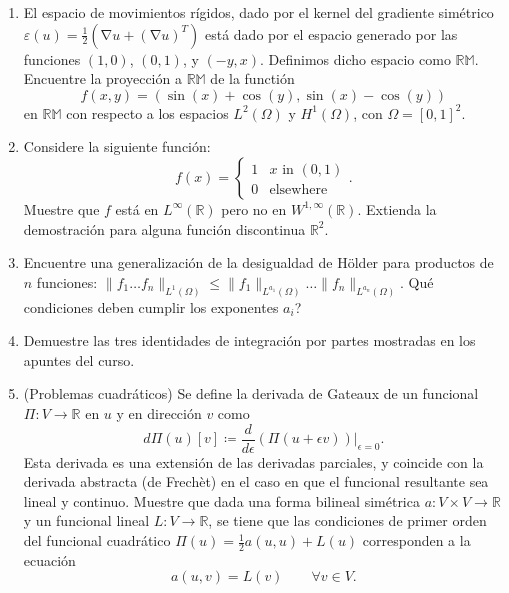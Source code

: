 \documentclass{article}
\DeclareMathOperator{\grad}{\nabla}
\newcommand{\R}{\mathbb{R}}
\begin{document}
\begin{enumerate}
    \item El espacio de movimientos rígidos, dado por el kernel del gradiente simétrico $\varepsilon(u) = \frac 1 2 \left( \grad u + (\grad u)^T \right)$ está dado por el espacio generado por las funciones $(1,0)$, $(0,1)$, y $(-y, x)$. Definimos dicho espacio como $\mathbb{RM}$. Encuentre la proyección a $\mathbb{RM}$ de la functión 
        $$ f(x,y) = (\sin(x) + \cos(y), \sin(x) - \cos(y)) $$
    en $\mathbb{RM}$ con respecto a los espacios $L^2(\Omega)$ y $H^1(\Omega)$, con $\Omega=[0,1]^2$.
    \item Considere la siguiente función: 
        $$ f(x) = \begin{cases}
                        1 & \text{$x$ in $(0,1)$} \\
                        0 & \text{elsewhere}
                    \end{cases}. $$
    Muestre que $f$ está en $L^\infty(\R)$ pero no en $W^{1,\infty}(\R)$. Extienda la demostración para alguna función discontinua $\R^2$. 
    \item Encuentre una generalización de la desigualdad de Hölder para productos de $n$ funciones: $\| f_1 \hdots f_n \|_{L^1(\Omega)} \leq \| f_1\|_{L^{a_1}(\Omega)} \hdots \| f_n \|_{L^{a_n}(\Omega)}$. Qué condiciones deben cumplir los exponentes $a_i$? 
    \item Demuestre las tres identidades de integración por partes mostradas en los apuntes del curso.
    \item (Problemas cuadráticos) Se define la derivada de Gateaux de un funcional $\Pi: V \to \R$ en $u$ y en dirección $v$ como
        $$ d\Pi(u)[v] \coloneqq \frac{d}{d\epsilon}\left.\left(\Pi(u + \epsilon v) \right)\right|_{\epsilon=0}. $$
    Esta derivada es una extensión de las derivadas parciales, y coincide con la derivada abstracta (de Frechèt) en el caso en que el funcional resultante sea lineal y continuo. 
    Muestre que dada una forma bilineal simétrica $a: V\times V \to \R$ y un funcional lineal $L:V\to \R$, se tiene que las condiciones de primer orden del funcional cuadrático $\Pi(u) = \frac 1 2 a(u,u) + L(u)$ corresponden a la ecuación 
        $$ a(u,v) = L(v) \qquad\forall v \in V. $$

\end{enumerate}
\end{document}

